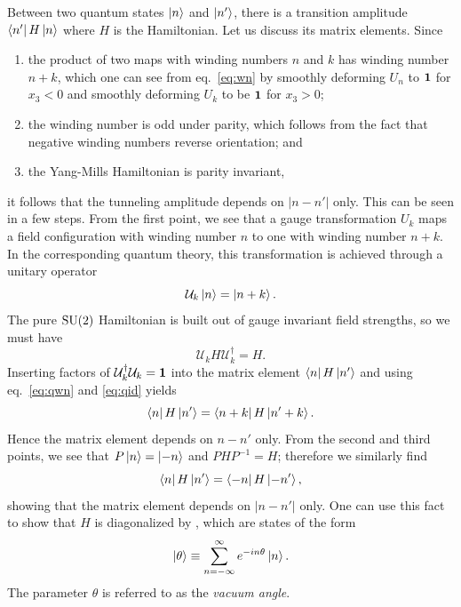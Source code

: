 Between two quantum states $\ket{n}$ and $\ket{n'}$, there is a 
transition amplitude $\bra{n'}H\ket{n}$ where $H$ is the Hamiltonian. 
Let us discuss its matrix elements. Since 
\begin{enumerate}
  \item the product of two maps with winding numbers $n$ and $k$ 
        has winding number $n+k$, which one can see from eq.~\eqref{eq:wn}
        by smoothly deforming $U_n$ to ${\mathbf 1}$ for $x_3<0$ and
        smoothly deforming $U_k$ to be ${\mathbf 1}$ for $x_3>0$;
  \item the winding number is odd under parity, which follows from the
        fact that negative winding numbers reverse orientation; and
  \item the Yang-Mills Hamiltonian is parity invariant,
\end{enumerate}
it follows that the tunneling amplitude depends on $|n-n'|$ only.
This can be seen in a few steps. From the first point, we see that
a gauge transformation $U_k$ maps a field configuration with
winding number $n$ to one with winding number $n+k$. In the
corresponding quantum theory, this transformation is achieved 
through a unitary operator
\begin{equation}\label{eq:qwn}
  \mathcal{U}_k\ket{n}=\ket{n+k}.
\end{equation}
The pure $\operatorname{SU}(2)$ Hamiltonian is built out of gauge invariant
field strengths, so we must have 
\begin{equation}\label{eq:qid}
  \mathcal{U}_kH\mathcal{U}_k^\dagger=H.
\end{equation}
Inserting factors of $\mathcal{U}_k^\dagger\mathcal{U}_k={\mathbf 1}$ into
the matrix element $\bra{n}H\ket{n'}$ and using eq.~\eqref{eq:qwn}
and \eqref{eq:qid} yields
\begin{equation}
  \bra{n}H\ket{n'}=\bra{n+k}H\ket{n'+k}.
\end{equation}
Hence the matrix element depends on $n-n'$ only. From the second and
third points, we see that $P\ket{n}=\ket{-n}$ and $PHP^{-1}=H$;
therefore we similarly find
\begin{equation}
  \bra{n}H\ket{n'}=\bra{-n}H\ket{-n'},
\end{equation}
showing that the matrix element depends on $|n-n'|$ only.
One can use this fact to show that $H$ is diagonalized by 
, which are states of the form
\begin{equation}
  \ket{\theta}\equiv\sum\limits_{n=-\infty}^\infty e^{-i n\theta}\ket{n}.
\end{equation}
The parameter $\theta$ is referred to as the {\it vacuum angle}. 


